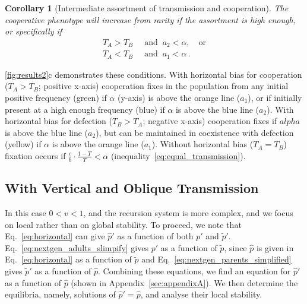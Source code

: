 \documentclass[12pt]{extarticle}
\newtheorem{corollary}{Corollary}
\begin{document}
{\begin{corollary}[Intermediate assortment of transmission and cooperation]
The cooperative phenotype will increase from rarity if the assortment is high enough, or specifically if
  \begin{equation} \label{eq:unequal_transmission_from_rarity_in_alpha_terms}
    \begin{aligned}
    T_A > T_B &\;\; \text{and} \;\; a_2 < \alpha, \quad \text{or} \\
    T_A < T_B &\;\; \text{and} \;\; a_1 < \alpha \,.
    \end{aligned}
    \end{equation} 
\end{corollary}

\autoref{fig:results2}c demonstrates these conditions. With horizontal bias for cooperation ($T_A>T_B$; positive x-axis) cooperation fixes in the population from any initial positive frequency (green) if $\alpha$ (y-axis) is above the orange line ($a_1$), or if initially present at a high enough frequency (blue) if $\alpha$ is above the blue line ($a_2$).
With horizontal bias for defection ($T_B>T_A$; negative x-axis) cooperation fixes if $alpha$ is above the blue line ($a_2$), but can be maintained in coexistence with defection (yellow) if $\alpha$ is above the orange line ($a_1$). Without horizontal bias ($T_A=T_B$) fixation occurs if $\frac{c}{b} \cdot \frac{1-T}{T} < \alpha$ (inequality~\ref{eq:equal_transmission}).



\subsection*{With Vertical and Oblique Transmission}

In this case $0<v<1$, and the recursion system is more complex,
and we focus on local rather than on global stability.
To proceed, we note that 
Eq.\ \ref{eq:horizontal} can give $\hat{p}'$ as a function of both $p'$ and $\tilde{p}'$.
Eq.\ \ref{eq:nextgen_adults_slimpify} gives $p'$ as a function of $\tilde{p}$, since $\hat{p}$ is given in Eq.\ \ref{eq:horizontal} as a function of $\tilde{p}$ and 
Eq.\ \ref{eq:nextgen_parents_simplified} gives $\tilde{p}'$ as a function of $\hat{p}$. 
Combining these equations, we find an equation for $\hat{p}'$ as a function of $\hat{p}$ (shown in Appendix~\autoref{sec:appendixA}).
We then determine the equilibria, namely, solutions of $\hat{p}' = \hat{p}$, and analyse their local stability.

}
\end{document}
